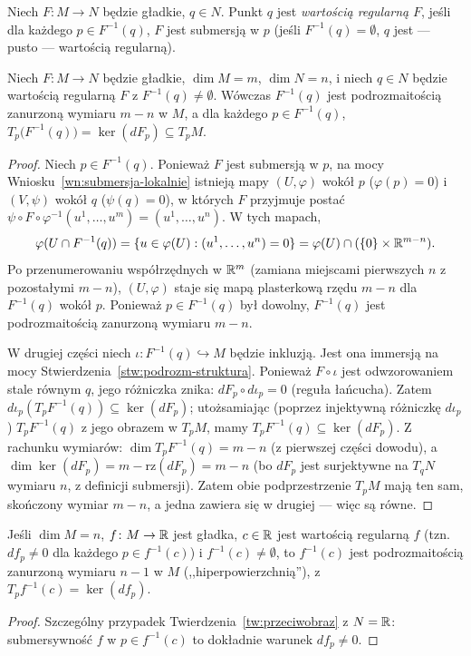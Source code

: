 \begin{definicja}
Niech $F\colon M\to N$ będzie gładkie, $q\in N$. Punkt $q$ jest \emph{wartością regularną}
$F$, jeśli dla każdego $p\in F^{-1}(q)$, $F$ jest submersją w $p$ (jeśli $F^{-1}(q)=
\emptyset$, $q$ jest — pusto — wartością regularną).
\end{definicja}

\begin{twierdzenie}\label{tw:przeciwobraz}
Niech $F\colon M\to N$ będzie gładkie, $\dim M=m$, $\dim N=n$, i niech $q\in N$ będzie
wartością regularną $F$ z $F^{-1}(q)\neq\emptyset$. Wówczas $F^{-1}(q)$ jest
podrozmaitością zanurzoną wymiaru $m-n$ w $M$, a dla każdego $p\in F^{-1}(q)$,
$T_p\big(F^{-1}(q)\big)=\ker(dF_p)\subseteq T_pM$.
\end{twierdzenie}
\begin{proof}
Niech $p\in F^{-1}(q)$. Ponieważ $F$ jest submersją w $p$, na mocy
Wniosku~\ref{wn:submersja-lokalnie} istnieją mapy $(U,\varphi)$ wokół $p$ ($\varphi(p)=0$)
i $(V,\psi)$ wokół $q$ ($\psi(q)=0$), w których $F$ przyjmuje postać $\psi\circ F\circ
\varphi^{-1}(u^1,\dots,u^m)=(u^1,\dots,u^n)$. W tych mapach,
\[
\varphi(U\cap F^{-1}(q))=\{u\in\varphi(U):(u^1,\dots,u^n)=0\}=\varphi(U)\cap(\{0\}\times
\mathbb{R}^{m-n}).
\]
Po przenumerowaniu współrzędnych w $\mathbb{R}^m$ (zamiana miejscami pierwszych $n$ z pozostałymi
$m-n$), $(U,\varphi)$ staje się mapą plasterkową rzędu $m-n$ dla $F^{-1}(q)$ wokół $p$.
Ponieważ $p\in F^{-1}(q)$ był dowolny, $F^{-1}(q)$ jest podrozmaitością zanurzoną wymiaru
$m-n$.

W drugiej części niech $\iota\colon F^{-1}(q)\hookrightarrow M$
będzie inkluzją. Jest ona immersją na mocy
Stwierdzenia~\ref{stw:podrozm-struktura}. Ponieważ $F\circ\iota$ jest
odwzorowaniem stale równym $q$, jego różniczka znika: $dF_p\circ d\iota_p=0$ (reguła
łańcucha). Zatem $d\iota_p(T_pF^{-1}(q))\subseteq\ker(dF_p)$; utożsamiając (poprzez
injektywną różniczkę $d\iota_p$) $T_pF^{-1}(q)$ z jego obrazem w $T_pM$, mamy $T_pF^{-1}(q)
\subseteq\ker(dF_p)$. Z rachunku wymiarów: $\dim T_pF^{-1}(q)=m-n$ (z pierwszej części
dowodu), a $\dim\ker(dF_p)=m-\mathrm{rz}(dF_p)=m-n$ (bo $dF_p$ jest surjektywne na $T_qN$
wymiaru $n$, z definicji submersji). Zatem obie podprzestrzenie $T_pM$ mają ten sam,
skończony wymiar $m-n$, a jedna zawiera się w drugiej — więc są równe.
\end{proof}

\begin{wniosek}
Jeśli $\dim M=n$, $f\colon M\to\mathbb{R}$ jest gładka, $c\in\mathbb{R}$ jest wartością regularną $f$ (tzn.\
$df_p\neq0$ dla każdego $p\in f^{-1}(c)$) i $f^{-1}(c)\neq\emptyset$, to $f^{-1}(c)$ jest
podrozmaitością zanurzoną wymiaru $n-1$ w $M$ (,,hiperpowierzchnią''), z $T_pf^{-1}(c)=
\ker(df_p)$.
\end{wniosek}
\begin{proof}
Szczególny przypadek Twierdzenia~\ref{tw:przeciwobraz} z $N=\mathbb{R}$: submersywność $f$ w
$p\in f^{-1}(c)$ to dokładnie warunek $df_p\neq0$.
\end{proof}

